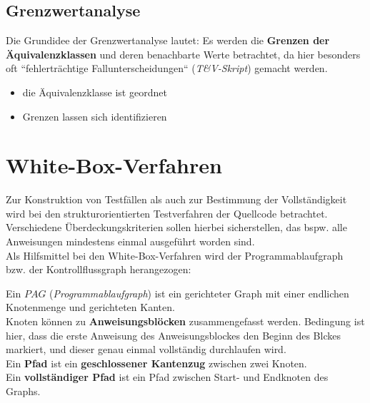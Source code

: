 \subsection*{Grenzwertanalyse}

Die Grundidee der Grenzwertanalyse lautet: Es werden die \textbf{Grenzen der Äquivalenzklassen} und deren benachbarte Werte betrachtet, da hier besonders oft ``fehlerträchtige Fallunterscheidungen`` (\textit{T\&V-Skript}) gemacht werden.

\vspace{5mm}
\begin{tcolorbox}[title={Vorraussetzungen für die Grenzwertanalyse}]
    \begin{itemize}
        \item die Äquivalenzklasse ist geordnet
        \item Grenzen lassen sich identifizieren
    \end{itemize}
\end{tcolorbox}

\section{White-Box-Verfahren}

Zur Konstruktion von Testfällen als auch zur Bestimmung der Vollständigkeit wird bei den strukturorientierten Testverfahren der Quellcode betrachtet.\\
Verschiedene Überdeckungskriterien sollen hierbei sicherstellen, das bspw. alle Anweisungen mindestens einmal ausgeführt worden sind.\\

\noindent
Als Hilfsmittel bei den White-Box-Verfahren wird der Programmablaufgraph bzw. der Kontrollflussgraph herangezogen:

\vspace{5mm}
\begin{tcolorbox}[title={Programmablaufgraph}]
    Ein $PAG$ (\textit{Programmablaufgraph}) ist ein gerichteter Graph mit einer endlichen Knotenmenge und gerichteten Kanten.\\

    \noindent
    Knoten können zu \textbf{Anweisungsblöcken} zusammengefasst werden.
    Bedingung ist hier, dass die erste Anweisung des Anweisungsblockes den Beginn des Blckes markiert, und dieser genau einmal vollständig durchlaufen wird.\\

    \noindent
    Ein \textbf{Pfad} ist ein \textbf{geschlossener Kantenzug} zwischen zwei Knoten.\\

    \noindent
    Ein \textbf{vollständiger Pfad} ist ein Pfad zwischen Start- und Endknoten des Graphs.
\end{tcolorbox}
\vspace{5mm}

